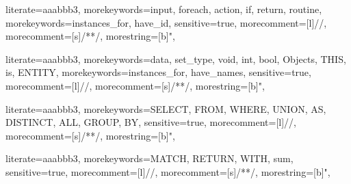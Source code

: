 
{
literate={aaa}{bbb}3,
morekeywords={input, foreach, action, if, return, routine},
morekeywords={instances_for, have_id},
sensitive=true,
morecomment=[l]{//},
morecomment=[s]{/*}{*/},
morestring=[b]",
}

{
literate={aaa}{bbb}3,
morekeywords={data, set_type, void, int, bool, Objects, THIS, is, ENTITY},
morekeywords={instances_for, have_names},
sensitive=true,
morecomment=[l]{//},
morecomment=[s]{/*}{*/},
morestring=[b]",
}

{
literate={aaa}{bbb}3,
morekeywords={SELECT, FROM, WHERE, UNION, AS, DISTINCT, ALL, GROUP, BY},
sensitive=true,
morecomment=[l]{//},
morecomment=[s]{/*}{*/},
morestring=[b]",
}

{
literate={aaa}{bbb}3,
morekeywords={MATCH, RETURN, WITH, sum},
sensitive=true,
morecomment=[l]{//},
morecomment=[s]{/*}{*/},
morestring=[b]",
}
